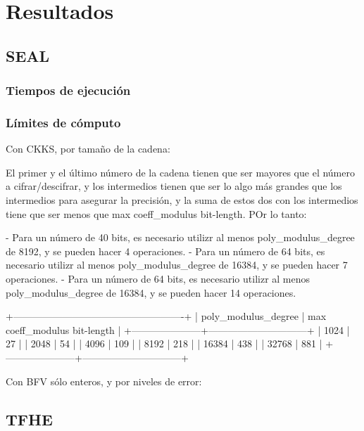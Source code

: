 \chapter{Resultados}
\label{chap:resultados}

\section{SEAL}

\subsection{Tiempos de ejecución}

\subsection{Límites de cómputo}

Con CKKS, por tamaño de la cadena:

El primer y el último número de la cadena tienen que ser mayores que el número a cifrar/descifrar, y los intermedios tienen que ser lo algo más grandes  que los intermedios para asegurar la precisión, y la suma de estos dos con los intermedios tiene que ser menos que max coeff_modulus bit-length. POr lo tanto:

- Para un número de 40 bits, es necesario utilizr al menos poly_modulus_degree de 8192, y se pueden hacer 4 operaciones.
- Para un número de 64 bits, es necesario utilizr al menos poly_modulus_degree de 16384, y se pueden hacer 7 operaciones.
- Para un número de 64 bits, es necesario utilizr al menos poly_modulus_degree de 16384, y se pueden hacer 14 operaciones.

  +----------------------------------------------------+
  | poly_modulus_degree | max coeff_modulus bit-length |
  +---------------------+------------------------------+
  | 1024                | 27                           |
  | 2048                | 54                           |
  | 4096                | 109                          |
  | 8192                | 218                          |
  | 16384               | 438                          |
  | 32768               | 881                          |
  +---------------------+------------------------------+

Con BFV sólo enteros, y por niveles de error:



\section{TFHE}


